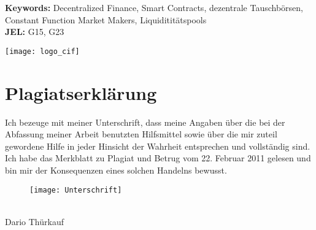 \documentclass[12pt,a4paper,titlepage,oneside,english]{article}
\begin{document}

\vfill
\textbf{Keywords:} Decentralized Finance, Smart Contracts, dezentrale Tauschbörsen, Constant Function Market Makers, Liquidititätspools\\
\noindent\textbf{JEL:} G15, G23



\newpage
{}
\tableofcontents

\vfill
\begin{center}
\texttt{[image: logo\_cif]}
\end{center}
\singlespacing
\vspace{-1.5cm}
\section*{Plagiatserklärung}
Ich bezeuge mit meiner Unterschrift, dass meine Angaben über die bei der Abfassung meiner Arbeit benutzten Hilfsmittel sowie über die mir zuteil gewordene Hilfe in jeder Hinsicht der Wahrheit entsprechen und vollständig sind. Ich habe das Merkblatt zu Plagiat und Betrug vom 22. Februar 2011 gelesen und bin mir der Konsequenzen eines solchen Handelns bewusst.\\
\begin{figure}[h!]
\begin{flushleft}
\texttt{[image: Unterschrift]}
\end{flushleft}
\end{figure}\\
Dario Thürkauf

\newpage
\onehalfspacing
{}


\end{document}
